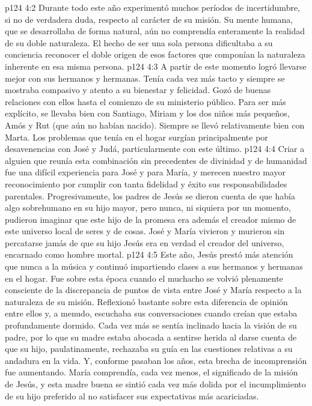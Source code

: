 \vs p124 4:2 Durante todo este año experimentó muchos períodos de incertidumbre, si no de verdadera duda, respecto al carácter de su misión. Su mente humana, que se desarrollaba de forma natural, aún no comprendía enteramente la realidad de su doble naturaleza. El hecho de ser una sola persona dificultaba a su conciencia reconocer el doble origen de esos factores que componían la naturaleza inherente en esa misma persona.
\vs p124 4:3 A partir de este momento logró llevarse mejor con sus hermanos y hermanas. Tenía cada vez más tacto y siempre se mostraba compasivo y atento a su bienestar y felicidad. Gozó de buenas relaciones con ellos hasta el comienzo de su ministerio público. Para ser más explícito, se llevaba bien con Santiago, Miriam y los dos niños más pequeños, Amós y Rut (que aún no habían nacido). Siempre se llevó relativamente bien con Marta. Los problemas que tenía en el hogar surgían principalmente por desavenencias con José y Judá, particularmente con este último.
\vs p124 4:4 \pc Criar a alguien que reunía esta combinación sin precedentes de divinidad y de humanidad fue una difícil experiencia para José y para María, y merecen nuestro mayor reconocimiento por cumplir con tanta fidelidad y éxito sus responsabilidades parentales. Progresivamente, los padres de Jesús se dieron cuenta de que había algo sobrehumano en su hijo mayor, pero nunca, ni siquiera por un momento, pudieron imaginar que este hijo de la promesa era además el creador mismo de este universo local de seres y de cosas. José y María vivieron y murieron sin percatarse jamás de que su hijo Jesús era en verdad el creador del universo, encarnado como hombre mortal.
\vs p124 4:5 Este año, Jesús prestó más atención que nunca a la música y continuó impartiendo clases a sus hermanos y hermanas en el hogar. Fue sobre esta época cuando el muchacho se volvió plenamente consciente de la discrepancia de puntos de vista entre José y María respecto a la naturaleza de su misión. Reflexionó bastante sobre esta diferencia de opinión entre ellos y, a menudo, escuchaba sus conversaciones cuando creían que estaba profundamente dormido. Cada vez más se sentía inclinado hacia la visión de su padre, por lo que su madre estaba abocada a sentirse herida al darse cuenta de que su hijo, paulatinamente, rechazaba su guía en las cuestiones relativas a su andadura en la vida. Y, conforme pasaban los años, esta brecha de incomprensión fue aumentando. María comprendía, cada vez menos, el significado de la misión de Jesús, y esta madre buena se sintió cada vez más dolida por el incumplimiento de su hijo preferido al no satisfacer sus expectativas más acariciadas.
